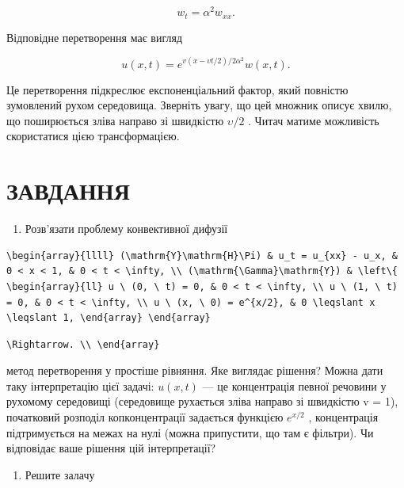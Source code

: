 \documentclass[
  ukrainian,
]{article}
\providecommand{\tightlist}{%
  \setlength{\itemsep}{0pt}\setlength{\parskip}{0pt}}
\begin{document}
\[
w_t = \alpha^2 w_{xx}.
\]

Відповідне перетворення має вигляд

\[
u(x, t) = e^{v(x-vt/2)/2\alpha^2}w(x, t).
\]

Це перетворення підкреслює експоненціальний фактор, який повністю
зумовлений рухом середовища. Зверніть увагу, що цей множник описує
хвилю, що поширюється зліва направо зі швидкістю \(\upsilon/2\) . Читач
матиме можливість скористатися цією трансформацією.

\section{ЗАВДАННЯ}\label{ux437ux430ux432ux434ux430ux43dux43dux44f-1}

\begin{enumerate}
\def\labelenumi{\arabic{enumi}.}
\tightlist
\item
  Розв'язати проблему конвективної дифузії
\end{enumerate}

\begin{verbatim}
\begin{array}{llll} (\mathrm{Y}\mathrm{H}\Pi) & u_t = u_{xx} - u_x, & 0 < x < 1, & 0 < t < \infty, \\ (\mathrm{\Gamma}\mathrm{Y}) & \left\{ \begin{array}{ll} u \ (0, \ t) = 0, & 0 < t < \infty, \\ u \ (1, \ t) = 0, & 0 < t < \infty, \\ u \ (x, \ 0) = e^{x/2}, & 0 \leqslant x \leqslant 1, \end{array} \end{array}
\end{verbatim}

\begin{verbatim}
\Rightarrow. \\ \end{array}
\end{verbatim}

метод перетворення у простіше рівняння. Яке виглядає рішення? Можна дати
таку інтерпретацію цієї задачі: \(u(x, t)\) --- це концентрація певної
речовини у рухомому середовищі (середовище рухається зліва направо зі
швидкістю v = 1), початковий розподіл копконцентрації задається функцією
\(e^{x/2}\) , концентрація підтримується на межах на нулі (можна
припустити, що там є фільтри). Чи відповідає ваше рішення цій
інтерпретації?

\begin{enumerate}
\def\labelenumi{\arabic{enumi}.}
\setcounter{enumi}{1}
\tightlist
\item
  Решите залачу
\end{enumerate}
\end{document}
